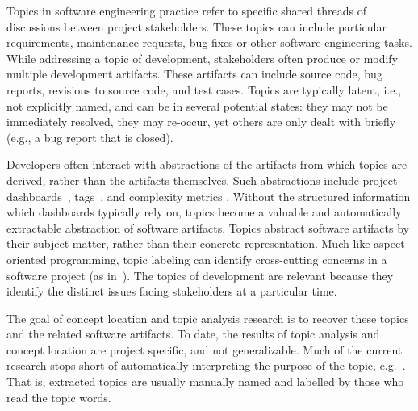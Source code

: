 \documentclass[]{sig-alternate}
\begin{document}








Topics in software engineering practice refer to specific shared threads of discussions between project stakeholders. 
These topics can include particular requirements, maintenance requests, bug fixes or other software engineering tasks. %
While addressing a topic of development, stakeholders often produce or modify multiple development artifacts.
%
These artifacts can include source code, bug reports, revisions to source code, and test cases. 
%
Topics are typically latent, i.e., not explicitly named, and can be in several potential states: they may not be immediately resolved, they may re-occur, yet others are only dealt with briefly  (e.g., a bug report that is closed).

Developers often interact with abstractions of the artifacts from which topics are derived, rather than the artifacts themselves.
Such abstractions include project dashboards~\cite{kersten2005mylar}, tags~\cite{treude2010}, and complexity metrics \cite{mccabe1976complexity}. 
Without the structured information which dashboards typically rely on, topics become a valuable and automatically extractable abstraction of software artifacts.
Topics abstract software artifacts by their subject matter, rather than their concrete representation. 
Much like aspect-oriented programming, topic labeling can identify cross-cutting concerns in a software project (as in~\cite{Baldi2008}).
The topics of development are relevant because they identify the distinct issues facing stakeholders at a particular time.

The goal of concept location and topic analysis research is to recover these topics and the related software artifacts.
To date, the results of topic analysis and concept location are project specific, and not generalizable.
Much of the current research stops short of automatically interpreting the purpose of the topic, e.g.~\cite{Baldi2008,Kuhn2007,marcus04wcre}. 
That is, extracted topics are usually manually named and labelled by those who read the topic words.
\end{document}
